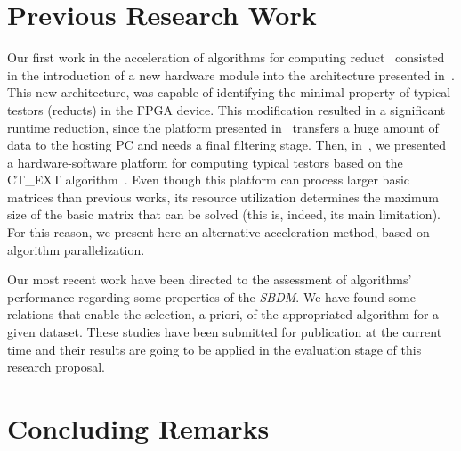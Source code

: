 \documentclass[citenumber]{elsarticle}
\begin{document}
\section{Previous Research Work} \label{preliminary}
%
	Our first work in the acceleration of algorithms for computing reduct~\cite{Rodriguez14} consisted in the introduction of a new hardware module into the architecture presented in~\cite{Rojas12}. This new architecture, was capable of identifying the minimal property of typical testors (reducts) in the FPGA device. This modification resulted in a significant runtime reduction, since the platform presented in~\cite{Rojas12} transfers a huge amount of data to the hosting PC and needs a final filtering stage. Then, in~\cite{Rodriguez15}, we presented a hardware-software platform for computing typical testors based on the CT\_EXT algorithm~\cite{Sanchez10}. Even though this platform can process larger basic matrices than previous works, its resource utilization determines the maximum size of the basic matrix that can be solved (this is, indeed, its main limitation). For this reason, we present here an alternative acceleration method, based on algorithm parallelization.
	
	Our most recent work have been directed to the assessment of algorithms' performance regarding some properties of the \textit{SBDM}. We have found some relations that enable the selection, a priori, of the appropriated algorithm for a given dataset. These studies have been submitted for publication at the current time and their results are going to be applied in the evaluation stage of this research proposal. 
%
\section{Concluding Remarks}\label{conclusions}
%

  
%


\end{document}
